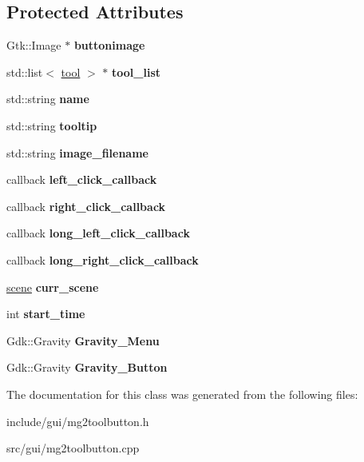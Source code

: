 \subsection*{Protected Attributes}
\begin{DoxyCompactItemize}
\item 
\mbox{\label{classToolButton_a381f4cf6944b0e3ea5fcf4dbd1ac491a}} 
Gtk\+::\+Image $\ast$ {\bfseries buttonimage}
\item 
\mbox{\label{classToolButton_a3c683e4a86dc2e76909aefcd71850512}} 
std\+::list$<$ \hyperlink{structtool}{tool} $>$ $\ast$ {\bfseries tool\+\_\+list}
\item 
\mbox{\label{classToolButton_a329e834ebb6cfc7cca1874ab0b47414f}} 
std\+::string {\bfseries name}
\item 
\mbox{\label{classToolButton_a834d0cfa761d69ee768b0562e7481339}} 
std\+::string {\bfseries tooltip}
\item 
\mbox{\label{classToolButton_a3ce35e8419a6680e5d8e9e5f711f3e71}} 
std\+::string {\bfseries image\+\_\+filename}
\item 
\mbox{\label{classToolButton_a7f674d19e7d9af3807d94f81cbe71d0b}} 
callback {\bfseries left\+\_\+click\+\_\+callback}
\item 
\mbox{\label{classToolButton_afe0806c31b798314310ad37162369c1b}} 
callback {\bfseries right\+\_\+click\+\_\+callback}
\item 
\mbox{\label{classToolButton_a7d8a68a2fa53753c59704d5169210335}} 
callback {\bfseries long\+\_\+left\+\_\+click\+\_\+callback}
\item 
\mbox{\label{classToolButton_abd8b114ecee692ca5ecd50b3e023d514}} 
callback {\bfseries long\+\_\+right\+\_\+click\+\_\+callback}
\item 
\mbox{\label{classToolButton_a851da747f79c3fe3bacabf47d0744b3e}} 
\hyperlink{classscene}{scene} {\bfseries curr\+\_\+scene}
\item 
\mbox{\label{classToolButton_a02e9e28b0bd54f8b53e35eb70b77aa24}} 
int {\bfseries start\+\_\+time}
\item 
\mbox{\label{classToolButton_a20b66e6a259c27e7d3db8b293cafa1e7}} 
Gdk\+::\+Gravity {\bfseries Gravity\+\_\+\+Menu}
\item 
\mbox{\label{classToolButton_a6a80c1eaa5cdb0e59c38630cf6172fde}} 
Gdk\+::\+Gravity {\bfseries Gravity\+\_\+\+Button}
\end{DoxyCompactItemize}


The documentation for this class was generated from the following files\+:\begin{DoxyCompactItemize}
\item 
include/gui/mg2toolbutton.\+h\item 
src/gui/mg2toolbutton.\+cpp\end{DoxyCompactItemize}
